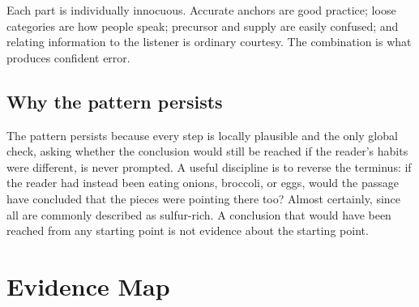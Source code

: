 \documentclass[11pt,a4paper]{article}
\theoremstyle{plain}
\theoremstyle{definition}
\theoremstyle{remark}
\begin{document}
Each part is individually innocuous. Accurate anchors are good practice; loose categories are how people speak; precursor and supply are easily confused; and relating information to the listener is ordinary courtesy. The combination is what produces confident error.

\subsection{Why the pattern persists}

The pattern persists because every step is locally plausible and the only global check, asking whether the conclusion would still be reached if the reader's habits were different, is never prompted. A useful discipline is to reverse the terminus: if the reader had instead been eating onions, broccoli, or eggs, would the passage have concluded that the pieces were pointing there too? Almost certainly, since all are commonly described as sulfur-rich. A conclusion that would have been reached from any starting point is not evidence about the starting point.

\section{Evidence Map}
\end{document}
